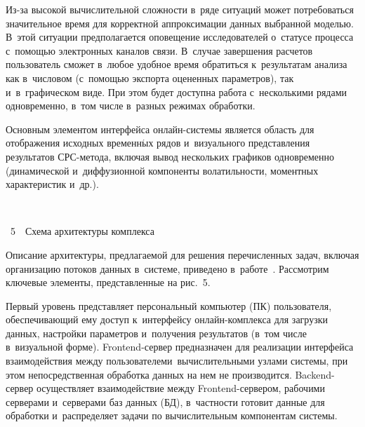\begin{multicols}{2}
Из-за высокой вычислительной сложности в~ряде ситуаций может 
потребоваться значительное время для корректной аппроксимации данных 
выбранной моделью. В~этой ситуации предполагается оповещение исследователей 
о~статусе процесса с~по\-мощью электронных каналов связи. В~случае завершения 
расчетов пользователь сможет в~любое удобное время обратиться 
к~результатам анализа как в~числовом (с~по\-мощью экспорта оцененных параметров), 
так и~в~графическом виде. При этом будет доступна работа с~несколькими рядами 
одновременно, в~том числе в~разных режимах обработки.






Основным элементом интерфейса он\-лайн-сис\-те\-мы является область для
отображения исходных временн$\acute{\mbox{ы}}$х рядов и~визуального представления
результатов СРС-ме\-то\-да, включая вывод
нескольких графиков одновременно (динамической и~диффузионной
компоненты волатильности, моментных характеристик и~др.).

 \noindent
 \begin{center}  %
 \vspace*{-1pt}
\mbox{%
 \epsfxsize=78mm
 }



\vspace*{3pt}

\noindent
{{\figurename~5}\ \ \small{Схема архитектуры комплекса}}
\end{center} 

 \vspace*{6pt}

Описание архитектуры, предлагаемой для решения перечисленных задач, 
включая организацию потоков данных в~системе, приведено в~работе~\cite{Gorshenin2015c}. 
Рассмотрим ключевые элементы, представленные на рис.~5.


Первый уровень представляет персональный компьютер (ПК) пользователя, 
обеспечивающий ему доступ к~интерфейсу он\-лайн-ком\-плек\-са для загрузки 
данных, настройки параметров и~получения результатов (в~том числе в~визуальной 
форме). Frontend-сер\-вер предназначен для реализации интерфейса взаимодействия 
между пользователем\linebreak и~вычислительными узлами системы, при этом 
непосредст\-венная обработка данных на нем не производится. Backend-сер\-вер 
осуществляет взаимодействие между Frontend-сер\-ве\-ром, рабочими серверами 
и~серверами баз данных (БД), в~част\-ности готовит данные для обработки 
и~распределяет задачи по вычислительным компонентам системы.


\end{multicols}
